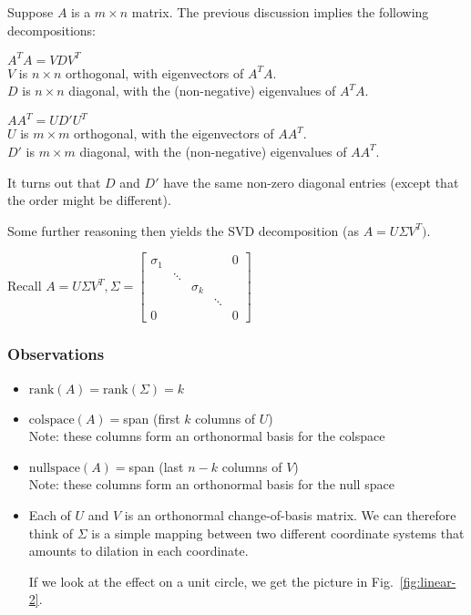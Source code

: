 Suppose $A$ is a $m \times n$ matrix. The previous discussion implies the following decompositions:
\begin{description}
    \item $A^TA=VDV^T$ \\ 
        $V$ is $n \times n$ orthogonal, with eigenvectors of $A^TA$. \\
        $D$ is $n \times n$ diagonal, with the (non-negative) eigenvalues of $A^TA$.
    \item $AA^T = UD' U^T$ \\
        $U$ is $m \times m$ orthogonal, with the eigenvectors of $AA^T$. \\
        $D'$ is $m \times m$ diagonal, with the (non-negative) eigenvalues of $AA^T$.
\end{description}

It turns out that $D$ and $D'$ have the same non-zero diagonal entries (except that the order might be different). 

Some further reasoning then yields the SVD decomposition (as $A = U \Sigma V^T)$.

Recall $A = U \Sigma V^T, \Sigma = \begin{bmatrix}
    \sigma_1 & & & & 0 \\
    & \ddots & & & \\ 
    & & \sigma_k & & \\
    & & & \ddots & \\ 
    0 & & & & 0
\end{bmatrix}$

\subsubsection*{Observations}

\begin{itemize}
    \item $\text{rank}(A) = \text{rank}(\Sigma) = k$
    \item $\text{colspace}(A) = $span (first $k$ columns of $U$) \\
        Note: these columns form an orthonormal basis for the colspace
    \item $\text{nullspace}(A) = $span (last $n-k$ columns of $V$) \\
        Note: these columns form an orthonormal basis for the null space
    \item Each of $U$ and $V$ is an orthonormal change-of-basis matrix. We can therefore think of $\Sigma$ is a simple mapping between two different coordinate systems that amounts to dilation in each coordinate. 
    
    If we look at the effect on a unit circle, we get the picture in Fig.~\ref{fig:linear-2}.
\end{itemize}

